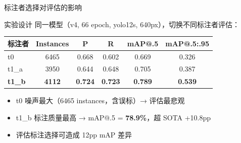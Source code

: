 \documentclass[aspectratio=169, 11pt]{beamer}
\begin{document}
\begin{frame}{标注者选择对评估的影响}
  \begin{block}{实验设计}
    同一模型（v4, 66 epoch, yolo12s, 640px），切换不同标注者评估：
  \end{block}
  \vspace{0.3em}
  \centering
  \begin{tabular}{lccccc}
    \toprule
    标注者 & Instances & P & R & mAP@.5 & mAP@.5:.95 \\
    \midrule
    t0 & 6465 & 0.668 & 0.602 & 0.669 & 0.326 \\
    t1\_a & 3950 & 0.644 & 0.648 & 0.705 & 0.387 \\
    \textbf{t1\_b} & \textbf{4112} & \textbf{0.724} & \textbf{0.723} & \textbf{0.789} & \textbf{0.539} \\
    \bottomrule
  \end{tabular}
  \vspace{0.8em}
  \begin{itemize}
    \item t0 噪声最大（6465 instances，含误标）→ 评估最悲观
    \item t1\_b 标注质量最高 → mAP@.5 = \textbf{78.9\%}，超 SOTA +10.8pp
    \item \alert{评估标注选择可造成 12pp mAP 差异}
  \end{itemize}
\end{frame}
\end{document}
